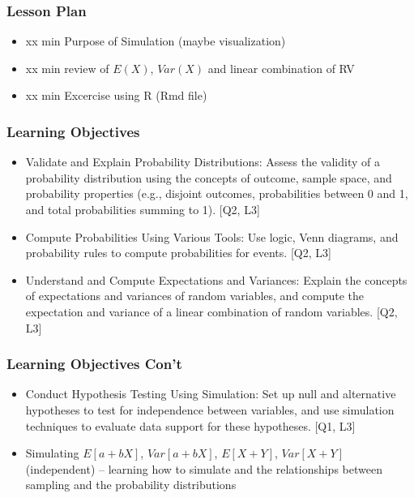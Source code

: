 

\begin{frame}
\frametitle{Lesson Plan}
\begin{itemize}
    \item xx min Purpose of Simulation (maybe visualization)
    \item xx min review of $E(X)$, $Var(X)$ and linear combination of RV
    \item xx min Excercise using R (Rmd file)
\end{itemize}
\end{frame}


\begin{frame}
\frametitle{Learning Objectives}

\begin{itemize}
    \item Validate and Explain Probability Distributions: Assess the validity of a probability distribution using the concepts of outcome, sample space, and probability properties (e.g., disjoint outcomes, probabilities between 0 and 1, and total probabilities summing to 1). [Q2, L3] 
    \item Compute Probabilities Using Various Tools: Use logic, Venn diagrams, and probability rules to compute probabilities for events. [Q2, L3] 
    \item Understand and Compute Expectations and Variances: Explain the concepts of expectations and variances of random variables, and compute the expectation and variance of a linear combination of random variables. [Q2, L3] 
\end{itemize}
\end{frame}


\begin{frame}
    \frametitle{Learning Objectives Con't}

    \begin{itemize}
        \item Conduct Hypothesis Testing Using Simulation: Set up null and alternative hypotheses to test for independence between variables, and use simulation techniques to evaluate data support for these hypotheses. [Q1, L3]
        \item Simulating $E[a+bX]$, $Var[a+bX]$, $E[X+Y]$, $Var[X+Y]$ (independent) -- learning how to simulate and the relationships between sampling and the probability distributions

    \end{itemize}
\end{frame}


